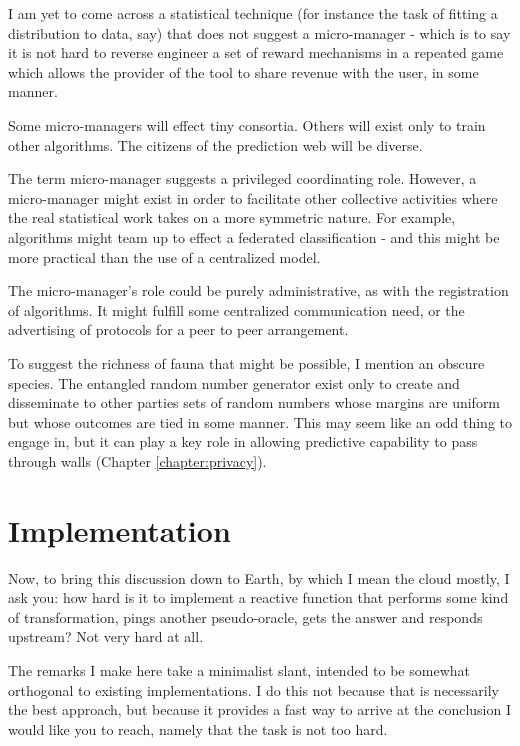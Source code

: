 I am yet to come across a statistical technique (for instance the task of fitting a distribution to data, say) that does not suggest a micro-manager - which is to say it is not hard to reverse engineer a set of reward mechanisms in a repeated game which allows the provider of the tool to share revenue with the user, in some manner. 


Some micro-managers will effect tiny consortia. Others will exist only to train other algorithms. The citizens of the prediction web will be diverse. 

The term micro-manager suggests a privileged coordinating role. However, a micro-manager might exist in order to facilitate other collective activities where the real statistical work takes on a more symmetric nature. For example, algorithms might team up to effect a federated classification - and this might be more practical than the use of a centralized model. 

The micro-manager's role could be purely administrative, as with the registration of algorithms. It might fulfill some centralized communication need, or the advertising of protocols for a peer to peer arrangement.  

To suggest the richness of fauna that might be possible, I mention an obscure species. The entangled random number generator exist only to create and disseminate to other parties sets of random numbers whose margins are uniform but whose outcomes are tied in some manner. This may seem like an odd thing to engage in, but it can play a key role in allowing predictive capability to pass through walls (Chapter \ref{chapter:privacy}).  


\section{Implementation}

Now, to bring this discussion down to Earth, by which I mean the cloud mostly, I ask you: how hard is it to implement a reactive function that performs some kind of transformation, pings another pseudo-oracle, gets the answer and responds upstream? Not very hard at all.   

The remarks I make here take a minimalist slant, intended to be somewhat orthogonal to existing implementations. I do this not because that is necessarily the best approach, but because it provides a fast way to arrive at the conclusion I would like you to reach, namely that the task is not too hard. 


